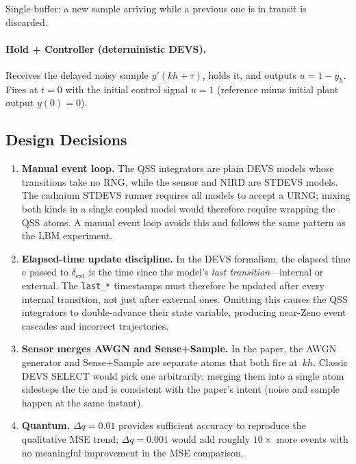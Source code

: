 Single-buffer: a new sample arriving while a previous one is in transit is
discarded.

\paragraph{Hold + Controller (deterministic DEVS).}

Receives the delayed noisy sample $y'(kh+\tau)$, holds it, and outputs
$u = 1 - y_h$.  Fires at $t=0$ with the initial control signal $u=1$
(reference minus initial plant output $y(0)=0$).

\subsection*{Design Decisions}

\begin{enumerate}

\item \textbf{Manual event loop.}
  The QSS integrators are plain DEVS models whose transitions take no RNG,
  while the sensor and NIRD are STDEVS models.
  The cadmium STDEVS runner requires all models to accept a URNG; mixing
  both kinds in a single coupled model would therefore require wrapping the
  QSS atoms.  A manual event loop avoids this and follows the same pattern
  as the LBM experiment.

\item \textbf{Elapsed-time update discipline.}
  In the DEVS formalism, the elapsed time $e$ passed to
  $\delta_{\mathrm{ext}}$ is the time since the model's \emph{last
  transition}---internal or external.  The \texttt{last\_*} timestamps must
  therefore be updated after every internal transition, not just after
  external ones.  Omitting this causes the QSS integrators to double-advance
  their state variable, producing near-Zeno event cascades and incorrect
  trajectories.

\item \textbf{Sensor merges AWGN and Sense+Sample.}
  In the paper, the AWGN generator and Sense+Sample are separate atoms that
  both fire at~$kh$.  Classic DEVS SELECT would pick one arbitrarily;
  merging them into a single atom sidesteps the tie and is consistent with
  the paper's intent (noise and sample happen at the same instant).

\item \textbf{Quantum.}
  $\Delta q = 0.01$ provides sufficient accuracy to reproduce the
  qualitative MSE trend; $\Delta q = 0.001$ would add roughly $10\times$
  more events with no meaningful improvement in the MSE comparison.

\end{enumerate}

